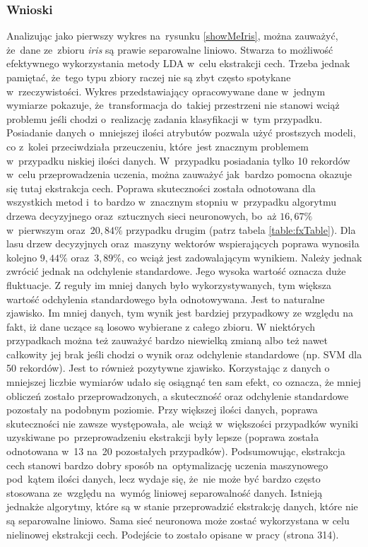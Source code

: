 \subsubsection{Wnioski}
Analizując jako pierwszy wykres na~rysunku \ref{showMeIris}, można zauważyć, że~dane ze~zbioru \textit{iris} są prawie separowalne liniowo. Stwarza to możliwość efektywnego wykorzystania metody LDA w~celu ekstrakcji cech. Trzeba jednak pamiętać, że~tego typu zbiory raczej nie są zbyt często spotykane w~rzeczywistości. Wykres przedstawiający opracowywane dane w~jednym wymiarze pokazuje, że~transformacja do~takiej przestrzeni nie stanowi wciąż problemu jeśli chodzi o~realizację zadania klasyfikacji w~tym przypadku. Posiadanie danych o~mniejszej ilości atrybutów pozwala użyć prostszych modeli, co z~kolei przeciwdziała przeuczeniu, które~jest znacznym problemem w~przypadku niskiej ilości danych. W~przypadku posiadania tylko 10 rekordów w~celu przeprowadzenia uczenia, można zauważyć jak~bardzo pomocna okazuje się tutaj ekstrakcja cech. Poprawa skuteczności została odnotowana dla wszystkich metod i~to bardzo w~znacznym stopniu w~przypadku algorytmu drzewa decyzyjnego oraz~sztucznych sieci neuronowych, bo~aż $16,67 \%$ w~pierwszym oraz~$20,84 \%$ przypadku drugim (patrz tabela \ref{table:fxTable}). Dla lasu drzew decyzyjnych oraz~maszyny wektorów wspierających poprawa wynosiła kolejno $9,44 \%$ oraz~$3,89 \%$, co wciąż jest zadowalającym wynikiem.  Należy jednak zwrócić jednak na odchylenie standardowe. Jego wysoka wartość oznacza duże fluktuacje. Z reguły im mniej danych było wykorzystywanych, tym większa wartość odchylenia standardowego była odnotowywana. Jest to naturalne zjawisko. Im mniej danych, tym wynik jest bardziej przypadkowy ze względu na fakt, iż dane uczące są losowo wybierane z całego zbioru. W niektórych przypadkach można też zauważyć bardzo niewielką zmianą albo też nawet całkowity jej brak jeśli chodzi o wynik oraz odchylenie standardowe (np. SVM dla 50 rekordów). Jest to również pozytywne zjawisko. Korzystając z danych o mniejszej liczbie wymiarów udało się osiągnąć ten sam efekt, co oznacza, że mniej obliczeń zostało przeprowadzonych, a skuteczność oraz odchylenie standardowe pozostały na podobnym poziomie. Przy większej ilości danych, poprawa skuteczności nie zawsze występowała, ale~wciąż w~większości przypadków wyniki uzyskiwane po~przeprowadzeniu ekstrakcji były lepsze (poprawa została odnotowana w~13 na~20 pozostałych przypadków). Podsumowując, ekstrakcja cech stanowi bardzo dobry sposób na~optymalizację uczenia maszynowego pod~kątem ilości danych, lecz wydaje się, że~nie może być bardzo często stosowana ze~względu na~wymóg liniowej separowalność danych. Istnieją jednakże algorytmy, które są w stanie przeprowadzić ekstrakcję danych, które nie są separowalne liniowo. Sama sieć neuronowa może zostać wykorzystana w celu nielinowej ekstrakcji cech.  Podejście to zostało opisane w pracy \cite{bishop1995neural} (strona 314).

